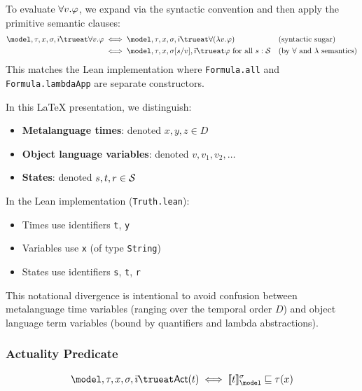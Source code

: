 \documentclass[../LogosReference.tex]{subfiles}
\begin{document}
\begin{remark}
To evaluate $\forall v.\varphi$, we expand via the syntactic convention and then apply the primitive semantic clauses:
\begin{align*}
    \model, \tau, x, \assignment, \tempindex \trueat \forall v.\metaA
    &\iff \model, \tau, x, \assignment, \tempindex \trueat \forall(\lambda v.\metaA) && \text{(syntactic sugar)} \\
    &\iff \model, \tau, x, \assignsub{s}{v}, \tempindex \trueat \metaA \text{ for all } s : \statespace && \text{(by $\forall$ and $\lambda$ semantics)}
\end{align*}
This matches the Lean implementation where \texttt{Formula.all} and \texttt{Formula.lambdaApp} are separate constructors.
\end{remark}

\begin{remark}\label{rem:naming-conventions}
In this LaTeX presentation, we distinguish:
\begin{itemize}
    \item \textbf{Metalanguage times}: denoted $x, y, z \in D$
    \item \textbf{Object language variables}: denoted $v, v_1, v_2, \ldots$
    \item \textbf{States}: denoted $s, t, r \in \mathcal{S}$
\end{itemize}
In the Lean implementation (\texttt{Truth.lean}):
\begin{itemize}
    \item Times use identifiers \texttt{t}, \texttt{y}
    \item Variables use \texttt{x} (of type \texttt{String})
    \item States use identifiers \texttt{s}, \texttt{t}, \texttt{r}
\end{itemize}
This notational divergence is intentional to avoid confusion between metalanguage time variables (ranging over the temporal order $D$) and object language term variables (bound by quantifiers and lambda abstractions).
\end{remark}

\subsubsection{Actuality Predicate}

\begin{definition}[Actuality]\label{def:actuality-truth}
	\[
		\model, \tau, x, \assignment, \tempindex \trueat \actual(t) \iff \sem{t}^\assignment_\model \parthood \tau(x)
	\]
\end{definition}
\end{document}
